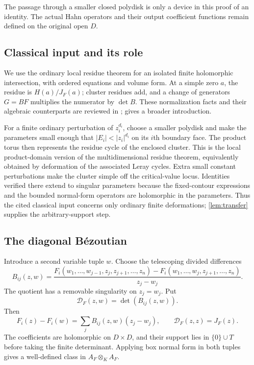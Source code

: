 \documentclass[11pt,letterpaper]{article}
\theoremstyle{definition}
\theoremstyle{remark}
\numberwithin{equation}{section}
\begin{document}
The passage through a smaller closed polydisk is only a device in this proof of an identity. The actual Hahn operators and their output coefficient functions remain defined on the original open $D$.

\subsection{Classical input and its role}
We use the ordinary local residue theorem for an isolated finite holomorphic intersection, with ordered equations and volume form. At a simple zero $a$, the residue is $H(a)/J_F(a)$; cluster residues add, and a change of generators $G=BF$ multiplies the numerator by $\det B$. These normalization facts and their algebraic counterparts are reviewed in \cite[\S0]{CDS}; \cite{CD} gives a broader introduction.

For a finite ordinary perturbation of $z_i^{d_i}$, choose a smaller polydisk and make the parameters small enough that $|E_i|<|z_i|^{d_i}$ on its $i$th boundary face. The product torus then represents the residue cycle of the enclosed cluster. This is the local product-domain version of the multidimensional residue theorem, equivalently obtained by deformation of the associated Leray cycles. Extra small constant perturbations make the cluster simple off the critical-value locus. Identities verified there extend to singular parameters because the fixed-contour expressions and the bounded normal-form operators are holomorphic in the parameters. Thus the cited classical input concerns only ordinary finite deformations; \cref{lem:transfer} supplies the arbitrary-support step.

\subsection{The diagonal B\'ezoutian}
Introduce a second variable tuple $w$. Choose the telescoping divided differences
\begin{equation}\label{eq:bezentries}
 B_{ij}(z,w)=
 \frac{F_i(w_1,\ldots,w_{j-1},z_j,z_{j+1},\ldots,z_n)
      -F_i(w_1,\ldots,w_j,z_{j+1},\ldots,z_n)}{z_j-w_j}.
\end{equation}
The quotient has a removable singularity on $z_j=w_j$. Put
\[
 \mathcal D_F(z,w)=\det(B_{ij}(z,w)).
\]
Then
\begin{equation}\label{eq:bezrelation}
 F_i(z)-F_i(w)=\sum_jB_{ij}(z,w)(z_j-w_j),
 \qquad \mathcal D_F(z,z)=J_F(z).
\end{equation}
The coefficients are holomorphic on $D\times D$, and their support lies in $\{0\}\cup T$ before taking the finite determinant. Applying box normal form in both tuples gives a well-defined class in $A_F\otimes_K A_F$.
\end{document}
